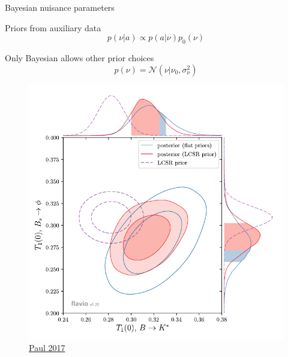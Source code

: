 \documentclass[
aspectratio=169,
14pt,
professionalfonts
]{beamer}
\begin{document}
\begin{frame}{Bayesian nuisance parameters}
    \begin{minipage}{0.6\textwidth}
        Priors from auxiliary data
        $$p(\nu|a) \propto p(a|\nu) p_0(\nu)$$
        
        Only Bayesian allows other prior choices
        $$ p(\nu) = \mathcal{N}(\nu | \nu_0, \sigma_\nu^2)$$
        
    \end{minipage}
    \begin{minipage}{0.39\textwidth}
        \begin{figure}
            \centering
            \includegraphics[width=\textwidth]{../plots/straub-posterior.pdf}
            \flushright \small
        \href{https://arxiv.org/pdf/2311.14647}{Paul 2017}
        \end{figure}
    \end{minipage}
\end{frame}
\end{document}
